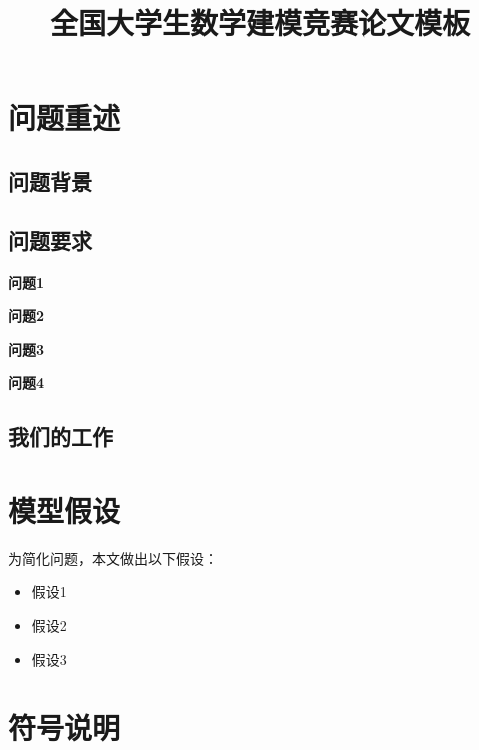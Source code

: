 \documentclass[withoutpreface,bwprint]{cumcmthesis}
\title{全国大学生数学建模竞赛论文模板}  %
\begin{document}
\maketitle


\tableofcontents  %
\newpage

\section{问题重述}
\subsection{问题背景}



\subsection{问题要求}

\textbf{问题1}  

\textbf{问题2}  

\textbf{问题3} 

\textbf{问题4}  

\subsection{我们的工作}


\section{模型假设}

为简化问题，本文做出以下假设：

\begin{itemize}[itemindent=2em]
\item 假设1
\item 假设2
\item 假设3
\end{itemize}

\section{符号说明}
\end{document}
